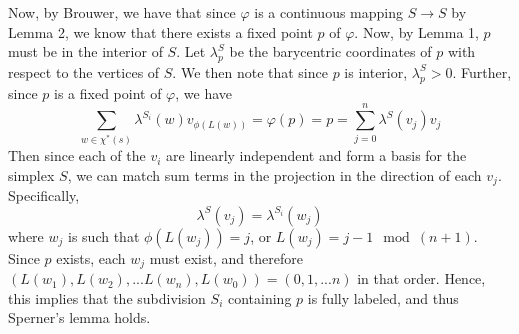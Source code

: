 \documentclass[10pt,letter]{article}
\begin{document}
Now, by Brouwer, we have that since $\varphi$ is a continuous mapping $S \to S$ by Lemma 2, we know that there exists a fixed point $p$ of $\varphi$. Now, by Lemma 1, $p$ must be in the interior of $S$. Let $\lambda^S_p$ be the barycentric coordinates of $p$ with respect to the vertices of $S$. We then note that since $p$ is interior, $\lambda^S_p > 0$. Further, since $p$ is a fixed point of $\varphi$, we have
\[  \sum_{w \in \chi^*(s) } \lambda^{S_i}(w) v_{\phi(L(w))} = \varphi(p) = p = \sum_{j = 0}^n \lambda^S(v_j) v_j \]
Then since each of the $v_i$ are linearly independent and form a basis for the simplex $S$, we can match sum terms in the projection in the direction of each $v_j$. Specifically,
\[ \lambda^S(v_j) = \lambda^{S_i}(w_j)  \]
where $w_j$ is such that $\phi(L(w_j)) = j$, or $L(w_j) = j-1 \mod (n+1)$. Since $p$ exists, each $w_j$ must exist, and therefore $(L(w_1), L(w_2), ... L(w_n), L(w_0)) = (0, 1, ... n)$ in that order. Hence, this implies that the subdivision $S_i$ containing $p$ is fully labeled, and thus Sperner's lemma holds. 
\end{document}
